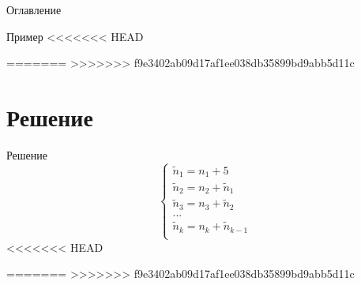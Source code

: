 \documentclass[12pt]{beamer}
\begin{document}
\begin{frame}{Оглавление}
\begin{frame}{Пример}
<<<<<<< HEAD
    
=======
>>>>>>> f9e3402ab09d17af1ee038db35899bd9abb5d11c
\end{frame}

\section{Решение}

\begin{frame}{Решение}
\fontsize{15pt}{15pt}\selectfont
    \begin{equation}
        \begin{cases}
            \widetilde{n}_{1} = n_{1} + 5\\
            \widetilde{n}_{2} = n_{2} + \widetilde{n}_{1}\\
            \widetilde{n}_{3} = n_{3} + \widetilde{n}_{2}\\
            ...\\
            \widetilde{n}_{k} = n_{k} + \widetilde{n}_{k-1}\\
        \end{cases}
    \end{equation}
<<<<<<< HEAD
    
    
=======
>>>>>>> f9e3402ab09d17af1ee038db35899bd9abb5d11c
\end{frame}


\end{frame}
\end{document}
